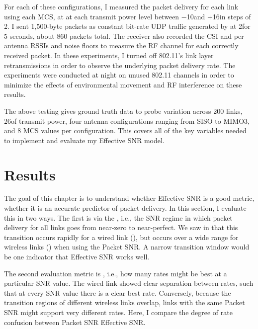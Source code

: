 For each of these configurations, I measured the packet delivery for each link using each MCS, at at each transmit power level between $-$10\dBm and $+$16\dBm in steps of 2\dB. I sent 1,500-byte packets as constant bit-rate UDP traffic generated by  at 2\Mbps for 5 seconds, about 860 packets total. The receiver also recorded the CSI and per antenna RSSIs and noise floors to measure the RF channel for each correctly received packet. In these experiments, I turned off 802.11's link layer retransmissions in order to observe the underlying packet delivery rate. The experiments were conducted at night on unused 802.11 channels in order to minimize the effects of environmental movement and RF interference on these results.


The above testing gives ground truth data to probe variation across 200 links, 26\dB of transmit power, four antenna configurations ranging from SISO to MIMO3, and 8 MCS values per configuration. This covers all of the key variables needed to implement and evaluate my Effective SNR model. 

\section{Results}
The goal of this chapter is to understand whether Effective SNR is a good metric, whether it is an accurate predictor of packet delivery. In this section, I evaluate this in two ways. The first is via the , i.e., the SNR regime in which packet delivery for all links goes from near-zero to near-perfect. We saw in  that this transition occurs rapidly for a wired link (), but occurs over a wide range for wireless links () when using the Packet SNR. A narrow transition window would be one indicator that Effective SNR works well.

The second evaluation metric is , i.e., how many rates might be best at a particular SNR value. The wired link showed clear separation between rates, such that at every SNR value there is a clear best rate. Conversely, because the transition regions of different wireless links overlap, links with the same Packet SNR might support very different rates. Here, I compare the degree of rate confusion between Packet SNR Effective SNR.

